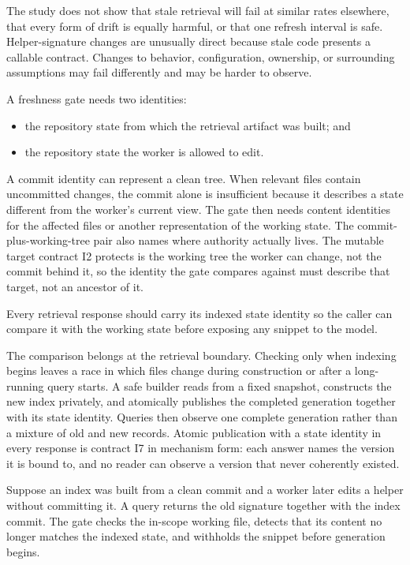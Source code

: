 The study does not show that stale retrieval will fail at similar rates elsewhere, that every form of drift is equally harmful, or that one refresh interval is safe. Helper-signature changes are unusually direct because stale code presents a callable contract. Changes to behavior, configuration, ownership, or surrounding assumptions may fail differently and may be harder to observe.


A freshness gate needs two identities:

\begin{itemize}
\tightlist
\item
  the repository state from which the retrieval artifact was built; and
\item
  the repository state the worker is allowed to edit.
\end{itemize}

A commit identity can represent a clean tree. When relevant files contain uncommitted changes, the commit alone is insufficient because it describes a state different from the worker's current view. The gate then needs content identities for the affected files or another representation of the working state. The commit-plus-working-tree pair also names where authority actually lives. The mutable target contract I2 protects is the working tree the worker can change, not the commit behind it, so the identity the gate compares against must describe that target, not an ancestor of it.

Every retrieval response should carry its indexed state identity so the caller can compare it with the working state before exposing any snippet to the model.

The comparison belongs at the retrieval boundary. Checking only when indexing begins leaves a race in which files change during construction or after a long-running query starts. A safe builder reads from a fixed snapshot, constructs the new index privately, and atomically publishes the completed generation together with its state identity. Queries then observe one complete generation rather than a mixture of old and new records. Atomic publication with a state identity in every response is contract I7 in mechanism form: each answer names the version it is bound to, and no reader can observe a version that never coherently existed.

Suppose an index was built from a clean commit and a worker later edits a helper without committing it. A query returns the old signature together with the index commit. The gate checks the in-scope working file, detects that its content no longer matches the indexed state, and withholds the snippet before generation begins.

